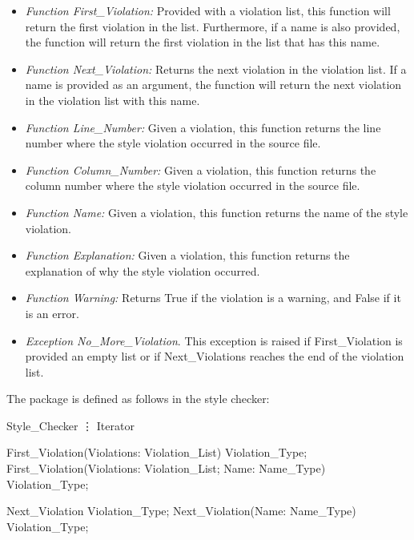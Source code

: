 \begin{itemize}

\item {\it Function First\_Violation:} Provided with a violation
list, this function will return the first violation in the list. Furthermore,
if a name is also provided, the function will return the first
violation in the list that has this name.


\item {\it Function Next\_Violation:} Returns the next violation in the
violation list. If a name is provided as an argument, the function will
return the next violation in the violation list with this name. 

\item {\it Function Line\_Number:} Given a violation, this function returns the 
line number where the style violation occurred in the source file.

\item {\it Function Column\_Number:} Given a violation, this function returns the 
column number where the style violation occurred in the source file.

\item {\it Function Name:} Given a violation, this function returns the 
name of the style violation.

\item {\it Function Explanation:} Given a violation, this function returns the 
explanation of why the style violation occurred.

\item {\it Function Warning:} Returns True if the violation is a warning, and
False if it is an error.

\item {\it Exception No\_More\_Violation}. This exception is raised if
First\_Violation is provided an empty list or if Next\_Violations reaches
the end of the violation list.

\end{itemize}

\noindent
The package is defined as follows in the style checker:

\apebegin\bhinge
\Package Style_Checker \Is
\vdots
  \Package Iterator \Is

    \Function First_Violation(Violations: Violation_List) \Return Violation_Type;
    \Function First_Violation(Violations: Violation_List; Name: Name_Type)
    \Return Violation_Type;

    \Function Next_Violation \Return Violation_Type;
    \Function Next_Violation(Name: Name_Type) \Return Violation_Type;

